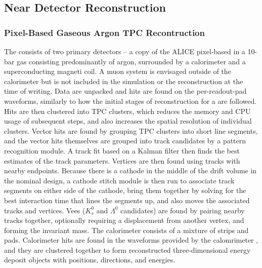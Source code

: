 \documentclass[../main-v1.tex]{subfiles}
\begin{document}
%
%
\subsection{Near Detector Reconstruction}
\subsubsection{Pixel-Based Gaseous Argon TPC Recontruction}
\label{sec:algo:reco:gartpc:pixels}

The  consists of two primary detectors -- a copy of the ALICE pixel-based  in a 10-bar gas consisting predominantly of argon, surrounded by a calorimeter and a superconducting magneti coil.  A muon system is envisaged outside of the calorimeter but is not included in the simulation or the reconstruction at the time of writing.  Data are unpacked and hits are found on the per-readout-pad waveforms, similarly to how the initial stages of reconstruction for a  are followed.  Hits are then clustered into TPC clusters, which reduces the memory and CPU usage of subsequent steps, and also increases the spatial resolution of individual clusters.  Vector hits are found by grouping TPC clusters into short line segments, and the vector hits themselves are grouped into track candidates by a pattern recognition module.  A track fit based on a Kalman filter then finds the best estimates of the track parameters.  Vertices are then found using tracks with nearby endpoints.  Because there is a cathode in the middle of the drift volume in the nominal design, a cathode stitch module is then run to associate track segments on either side of the cathode, bring them together by solving for the best interaction time that lines the segments up, and also moves the associated tracks and vertices.  Vees ($K^0_s$ and
$\Lambda^0$ candidates) are found by pairing nearby tracks together, optionally requiring a displacement from another vertex, and forming the invariant mass.  The calorimeter consists of a mixture of strips and pads.  Calorimeter hits are found in the  waveforms provided by the calomrimeter , and they are clustered together to form reconstructed three-dimensional energy deposit objects with positions, directions, and energies.
\end{document}
